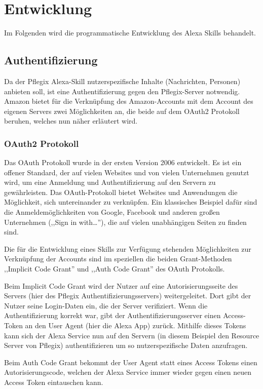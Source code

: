 \section{Entwicklung}\label{sec:development}
Im Folgenden wird die programmatische Entwicklung des Alexa Skills behandelt.
\subsection{Authentifizierung}
Da der Pflegix Alexa-Skill nutzerspezifische Inhalte (Nachrichten, Personen) anbieten soll, ist eine Authentifizierung gegen den Pflegix-Server notwendig. Amazon bietet für die Verknüpfung des Amazon-Accounts mit dem Account des eigenen Servers zwei Möglichkeiten an, die beide auf dem OAuth2 Protokoll beruhen, welches nun näher erläutert wird.
\subsubsection{OAuth2 Protokoll}
Das OAuth Protokoll wurde in der ersten Version 2006 entwickelt. Es ist ein offener Standard, der auf vielen Websites und von vielen Unternehmen genutzt wird, um eine Anmeldung und Authentifizierung auf den Servern zu gewährleisten.
Das OAuth-Protokoll bietet Websites und Anwendungen die Möglichkeit, sich untereinander zu verknüpfen. Ein klassisches Beispiel dafür sind die Anmeldemöglichkeiten von Google, Facebook und anderen großen Unternehmen (,,Sign in with\ldots''), die auf vielen unabhängigen Seiten zu finden sind.

Die für die Entwicklung eines Skills zur Verfügung stehenden Möglichkeiten zur Verknüpfung der Accounts sind im speziellen die beiden Grant-Methoden ,,Implicit Code Grant'' und ,,Auth Code Grant'' des OAuth Protokolls.

Beim Implicit Code Grant wird der Nutzer auf eine Autorisierungsseite des Servers (hier des Pflegix Authentifizierungsservers) weitergeleitet. Dort gibt der Nutzer seine Login-Daten ein, die der Server verifiziert. Wenn die Authentifizierung korrekt war, gibt der Authentifizierungsserver einen Access-Token an den User Agent (hier die Alexa App) zurück. Mithilfe dieses Tokens kann sich der Alexa Service nun auf den Servern (in diesem Beispiel den Resource Server von Pflegix) authentifizieren um so nutzerspezifische Daten anzufragen.

Beim Auth Code Grant bekommt der User Agent statt eines Access Tokens einen Autorisierungscode, welchen der Alexa Service immer wieder gegen einen neuen Access Token eintauschen kann.

